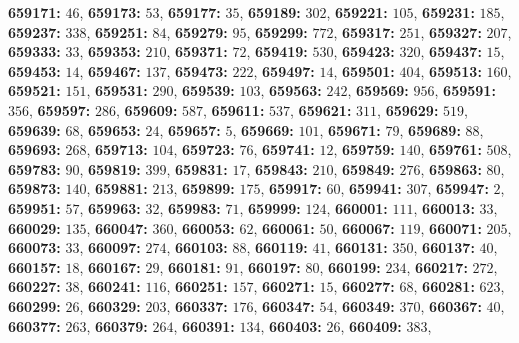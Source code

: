 \textsf{\bfseries 659171:} $46$, \textsf{\bfseries 659173:} $53$, \textsf{\bfseries 659177:} $35$, \textsf{\bfseries 659189:} $302$, \textsf{\bfseries 659221:} $105$, \textsf{\bfseries 659231:} $185$, \textsf{\bfseries 659237:} $338$, \textsf{\bfseries 659251:} $84$, \textsf{\bfseries 659279:} $95$, \textsf{\bfseries 659299:} $772$, \textsf{\bfseries 659317:} $251$, \textsf{\bfseries 659327:} $207$, \textsf{\bfseries 659333:} $33$, \textsf{\bfseries 659353:} $210$, \textsf{\bfseries 659371:} $72$, \textsf{\bfseries 659419:} $530$, \textsf{\bfseries 659423:} $320$, \textsf{\bfseries 659437:} $15$, \textsf{\bfseries 659453:} $14$, \textsf{\bfseries 659467:} $137$, \textsf{\bfseries 659473:} $222$, \textsf{\bfseries 659497:} $14$, \textsf{\bfseries 659501:} $404$, \textsf{\bfseries 659513:} $160$, \textsf{\bfseries 659521:} $151$, \textsf{\bfseries 659531:} $290$, \textsf{\bfseries 659539:} $103$, \textsf{\bfseries 659563:} $242$, \textsf{\bfseries 659569:} $956$, \textsf{\bfseries 659591:} $356$, \textsf{\bfseries 659597:} $286$, \textsf{\bfseries 659609:} $587$, \textsf{\bfseries 659611:} $537$, \textsf{\bfseries 659621:} $311$, \textsf{\bfseries 659629:} $519$, \textsf{\bfseries 659639:} $68$, \textsf{\bfseries 659653:} $24$, \textsf{\bfseries 659657:} $5$, \textsf{\bfseries 659669:} $101$, \textsf{\bfseries 659671:} $79$, \textsf{\bfseries 659689:} $88$, \textsf{\bfseries 659693:} $268$, \textsf{\bfseries 659713:} $104$, \textsf{\bfseries 659723:} $76$, \textsf{\bfseries 659741:} $12$, \textsf{\bfseries 659759:} $140$, \textsf{\bfseries 659761:} $508$, \textsf{\bfseries 659783:} $90$, \textsf{\bfseries 659819:} $399$, \textsf{\bfseries 659831:} $17$, \textsf{\bfseries 659843:} $210$, \textsf{\bfseries 659849:} $276$, \textsf{\bfseries 659863:} $80$, \textsf{\bfseries 659873:} $140$, \textsf{\bfseries 659881:} $213$, \textsf{\bfseries 659899:} $175$, \textsf{\bfseries 659917:} $60$, \textsf{\bfseries 659941:} $307$, \textsf{\bfseries 659947:} $2$, \textsf{\bfseries 659951:} $57$, \textsf{\bfseries 659963:} $32$, \textsf{\bfseries 659983:} $71$, \textsf{\bfseries 659999:} $124$, \textsf{\bfseries 660001:} $111$, \textsf{\bfseries 660013:} $33$, \textsf{\bfseries 660029:} $135$, \textsf{\bfseries 660047:} $360$, \textsf{\bfseries 660053:} $62$, \textsf{\bfseries 660061:} $50$, \textsf{\bfseries 660067:} $119$, \textsf{\bfseries 660071:} $205$, \textsf{\bfseries 660073:} $33$, \textsf{\bfseries 660097:} $274$, \textsf{\bfseries 660103:} $88$, \textsf{\bfseries 660119:} $41$, \textsf{\bfseries 660131:} $350$, \textsf{\bfseries 660137:} $40$, \textsf{\bfseries 660157:} $18$, \textsf{\bfseries 660167:} $29$, \textsf{\bfseries 660181:} $91$, \textsf{\bfseries 660197:} $80$, \textsf{\bfseries 660199:} $234$, \textsf{\bfseries 660217:} $272$, \textsf{\bfseries 660227:} $38$, \textsf{\bfseries 660241:} $116$, \textsf{\bfseries 660251:} $157$, \textsf{\bfseries 660271:} $15$, \textsf{\bfseries 660277:} $68$, \textsf{\bfseries 660281:} $623$, \textsf{\bfseries 660299:} $26$, \textsf{\bfseries 660329:} $203$, \textsf{\bfseries 660337:} $176$, \textsf{\bfseries 660347:} $54$, \textsf{\bfseries 660349:} $370$, \textsf{\bfseries 660367:} $40$, \textsf{\bfseries 660377:} $263$, \textsf{\bfseries 660379:} $264$, \textsf{\bfseries 660391:} $134$, \textsf{\bfseries 660403:} $26$, \textsf{\bfseries 660409:} $383$, 
